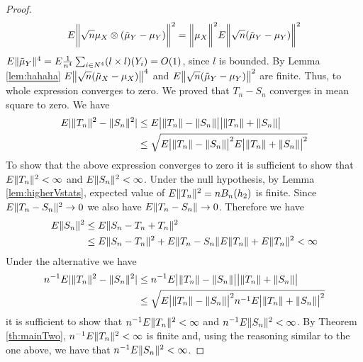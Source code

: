 \begin{proof}
\begin{align*}
   E \bigg \|  \sqrt n \mu_X \otimes ( \tilde \mu_Y   -\mu_Y) \bigg \|^2  &=    \bigg \|  \mu_X \bigg \|^2  E \bigg \|\sqrt n ( \tilde \mu_Y   -\mu_Y) \bigg \|^2  \\
\end{align*}
$ E   \| \tilde \mu_Y \|^4 = E \frac {1} {n^4} \sum_{i \in N^4} (l \times l)(Y_i) = O(1)$, since $ l$ is bounded. By Lemma \ref{lem:hahaha} $E \big \| \sqrt n ( \tilde \mu_X   -\mu_X) \big \|^4$ and $ E \big \|\sqrt n ( \tilde \mu_Y   -\mu_Y) \big \|^2$ are finite. Thus, to whole expression converges to zero. We proved  that $T_n-S_n$ converges in  mean square to zero.
We have 
\begin{align*}
  E | \|T_n\|^2 - \|S_n\|^2 |  & \leq E  \big | \|T_n\| - \|S_n\| \big | \big |  \|T_n\| +  \|S_n\| \big | \\
  &\leq \sqrt{ E \big | \|T_n\| - \|S_n\| \big |^2  E \big| \|T_n\| +  \|S_n\| \big|^2 }\\ 
\end{align*}
To show that the above expression converges to zero it is sufficient to show that  $E \|T_n\|^2< \infty$ and  $E  \|S_n\|^2< \infty$.
Under the null hypothesis, by Lemma \ref{lem:higherVstats}, expected value of   $E \|T_n\|^2 =n B_n(h_2) $ is finite. 
Since $E \| T_n -S_n\|^2 \to 0$ we also have  $E \| T_n -S_n\| \to 0$. 
Therefore we have 
\begin{align*}
 E \|S_n\|^2 &\leq E \|S_n-T_n+T_n\|^2 \\
 & \leq E \|S_n-T_n\|^2+ E \| T_n -S_n\| E \|T_n\| + E\|T_n\|^2 < \infty
\end{align*}
Under the alternative we have 
\begin{align*}
  n^{-1}  E | \|T_n\|^2 - \|S_n\|^2 |  &\leq n^{-1}  E \big | \|T_n\| - \|S_n\| \big | \big |   \|T_n\| +  \|S_n\| \big | \\
  &\leq \sqrt{ E \big | \|T_n\| - \|S_n\| \big |^2   n^{-1}E \big| \|T_n\| +  \|S_n\| \big|^2 }\\ 
\end{align*}
it is sufficient to show that  $n^{-1}  E\|T_n\|^2< \infty$ and  $n^{-1}  E \|S_n\|^2< \infty$. By Theorem \ref{th:mainTwo}, $n^{-1}  E \|T_n\|^2< \infty$ is finite and, using the reasoning similar to the one above, we have that    $n^{-1}  E \|S_n\|^2< \infty$.
\end{proof}

